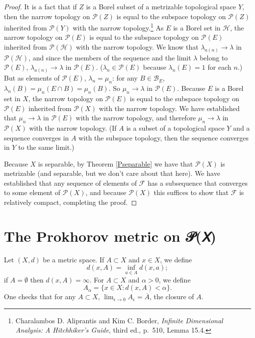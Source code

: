 \documentclass{article}
\theoremstyle{definition}
\begin{document}
\begin{proof}
It is a fact that if $Z$ is a Borel subset of a metrizable topological space $Y$, then the narrow topology
on $\mathscr{P}(Z)$ is equal to the subspace topology on $\mathscr{P}(Z)$ inherited from $\mathscr{P}(Y)$ with the narrow
topology.\footnote{Charalambos D. 
Aliprantis and Kim C. Border, {\em Infinite Dimensional Analysis: A Hitchhiker's Guide}, third ed., p.~510, Lemma 15.4.}
As $E$ is a Borel set in $\mathscr{H}$,  the narrow topology on $\mathscr{P}(E)$ is equal to the subspace
topology on $\mathscr{P}(E)$ inherited from $\mathscr{P}(\mathscr{H})$ with the narrow topology.
We know that $\lambda_{a(n)} \to \lambda$ in $\mathscr{P}(\mathscr{H})$, and since
the members of the sequence and the limit $\lambda$ belong to $\mathscr{P}(E)$, 
$\lambda_{a(n)} \to \lambda$ in 
$\mathscr{P}(E)$. ($\lambda_n \in \mathscr{P}(E)$ because $\lambda_n(E)=1$ for each $n$.)
But as elements of $\mathscr{P}(E)$, $\lambda_n = \mu_n$: for any $B \in \mathscr{B}_E$, $\lambda_n(B) = \mu_n(E \cap B)= \mu_n(B)$. 
So $\mu_n \to \lambda$ in $\mathscr{P}(E)$. 
Because $E$ is a Borel set in $X$, the narrow topology on $\mathscr{P}(E)$ is equal to the subspace topology on
$\mathscr{P}(E)$ inherited from $\mathscr{P}(X)$ with the narrow topology. We have established
 that $\mu_n \to \lambda$ in $\mathscr{P}(E)$ with the narrow
topology, and therefore $\mu_n \to \lambda$ in $\mathscr{P}(X)$ with the narrow topology. (If $A$ is a subset of a topological space $Y$ and
a sequence converges in $A$ with the subspace topology, then the sequence converges in $Y$ to the same limit.)

Because $X$ is separable, by Theorem \ref{Pseparable} we have that $\mathscr{P}(X)$ is metrizable (and separable, but we don't care about that here).
We have established that any sequence of elements of $\mathscr{F}$ has a subsequence that converges to some element of
$\mathscr{P}(X)$, and because $\mathscr{P}(X)$ this suffices to show that $\mathscr{F}$ is relatively compact, completing the proof.
\end{proof}

\section{The Prokhorov metric on 𝒫(𝘟)}
Let $(X,d)$ be a metric space. If $A \subset X$ and $x \in X$, we define
\[
d(x,A) = \inf_{a \in A} d(x,a);
\] 
if $A = \emptyset$ then $d(x,A)=\infty$. 
For $A \subset X$ and $\alpha >0$, we define
\[
A_\alpha = \{x \in X: d(x,A)<\alpha\}.
\]
One checks that for any $A \subset X$, $\lim_{\epsilon \to 0} A_\epsilon = \overline{A}$, the closure of $A$.
\end{document}
